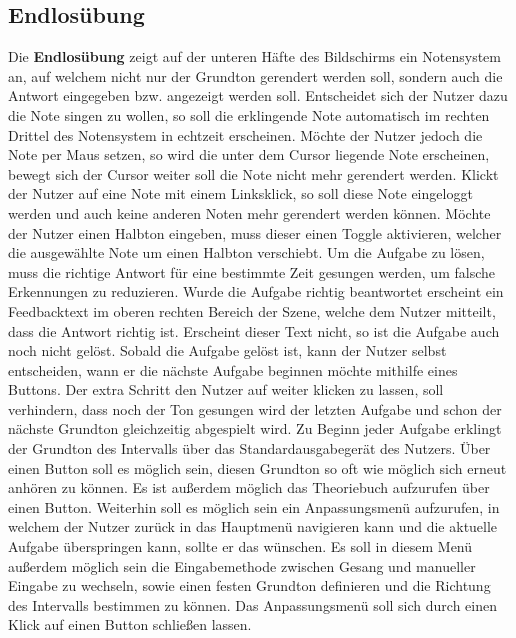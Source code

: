 \subsection{Endlosübung}
Die \textbf{Endlosübung} zeigt auf der unteren Häfte des Bildschirms ein Notensystem an, auf welchem nicht nur der Grundton gerendert werden soll, sondern auch die Antwort eingegeben bzw. angezeigt werden soll. Entscheidet sich der Nutzer dazu die Note singen zu wollen, so soll die erklingende Note automatisch im rechten Drittel des Notensystem in echtzeit erscheinen. Möchte der Nutzer jedoch die Note per Maus setzen, so wird die unter dem Cursor liegende Note erscheinen, bewegt sich der Cursor weiter soll die Note nicht mehr gerendert werden. Klickt der Nutzer auf eine Note mit einem Linksklick, so soll diese Note eingeloggt werden und auch keine anderen Noten mehr gerendert werden können. Möchte der Nutzer einen Halbton eingeben, muss dieser einen Toggle aktivieren, welcher die ausgewählte Note um einen Halbton verschiebt. Um die Aufgabe zu lösen, muss die richtige Antwort für eine bestimmte Zeit gesungen werden, um falsche Erkennungen zu reduzieren. Wurde die Aufgabe richtig beantwortet erscheint ein Feedbacktext im oberen rechten Bereich der Szene, welche dem Nutzer mitteilt, dass die Antwort richtig ist. Erscheint dieser Text nicht, so ist die Aufgabe auch noch nicht gelöst. Sobald die Aufgabe gelöst ist, kann der Nutzer selbst entscheiden, wann er die nächste Aufgabe beginnen möchte mithilfe eines Buttons. Der extra Schritt den Nutzer auf weiter klicken zu lassen, soll verhindern, dass noch der Ton gesungen wird der letzten Aufgabe und schon der nächste Grundton gleichzeitig abgespielt wird. Zu Beginn jeder Aufgabe erklingt der Grundton des Intervalls über das Standardausgabegerät des Nutzers. Über einen Button soll es möglich sein, diesen Grundton so oft wie möglich sich erneut anhören zu können. Es ist außerdem möglich das Theoriebuch aufzurufen über einen Button. Weiterhin soll es möglich sein ein Anpassungsmenü aufzurufen, in welchem der Nutzer zurück in das Hauptmenü navigieren kann und die aktuelle Aufgabe überspringen kann, sollte er das wünschen. Es soll in diesem Menü außerdem möglich sein die Eingabemethode zwischen Gesang und manueller Eingabe zu wechseln, sowie einen festen Grundton definieren und die Richtung des Intervalls bestimmen zu können. Das Anpassungsmenü soll sich durch einen Klick auf einen Button schließen lassen. 

